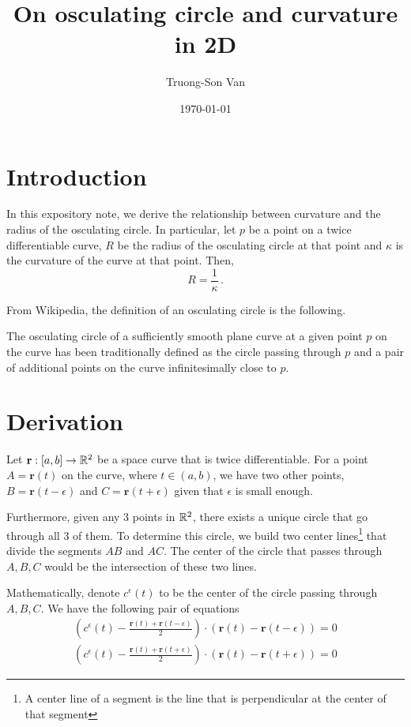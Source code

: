 \documentclass[12pt]{amsart}
\title{ On osculating circle and curvature in 2D }
\author{Truong-Son Van}
\date{\today}
\newcommand{\vect}{\mathbf}
\begin{document}
\maketitle


\section{Introduction}
In this expository note, we derive the relationship between curvature and the radius of the osculating circle.
In particular, let $p$ be a point on a twice differentiable curve, $R$ be
the radius of the osculating circle at that point and $\kappa$ is the curvature of the curve 
at that point. Then,
\begin{equation*}
    R = \frac{1}{\kappa} \,.
\end{equation*}


From Wikipedia, the definition of an osculating circle is the following.

\begin{definition}
The osculating circle of a sufficiently smooth plane curve at a given point $p$
on the curve has been traditionally defined as the circle passing through $p$
and a pair of additional points on the curve infinitesimally close to $p$.
\end{definition}

\section{Derivation}

Let $\vect{r}:[a,b]\to \R^2$  be a space curve that is twice differentiable.
For a point $A=\vect{r}(t)$ on the curve, where $t\in (a,b)$, we have two other points,
 $B=\vect{r}(t-\epsilon)$ and $C=\vect{r}(t+\epsilon)$ given that $\epsilon$ is small enough.

 Furthermore, given any 3 points in $\mathbb{R}^2$, there exists a unique circle that go through
 all 3 of them. 
 To determine this circle, we build two center lines\footnote{A center line 
 of a segment is the line that is perpendicular at the center of that segment}
     that divide the segments $AB$ and $AC$.
     The center of the circle that passes through $A,B,C$  would be the intersection of these two lines.

     Mathematically, denote $c^\epsilon(t)$ to be the center of the circle passing through $A,B,C$.
     We have the following pair of equations
     \begin{align*}
         \left(c^\epsilon(t) - \frac{\vect{r}(t) + \vect{r}(t-\epsilon)}{2} \right)\cdot\left( \vect{r}(t) - \vect{r}(t-\epsilon) \right) = 0  \\
         \left(c^\epsilon(t) - \frac{\vect{r}(t) + \vect{r}(t+\epsilon)}{2} \right)\cdot\left( \vect{r}(t) - \vect{r}(t+\epsilon) \right) = 0  
     \end{align*}
\end{document}

